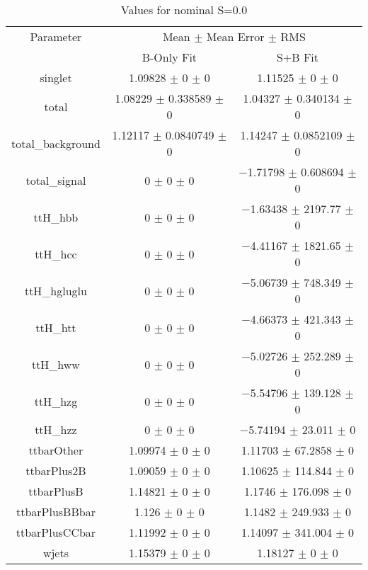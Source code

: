 \begin{table}
\centering
\caption{Values for nominal S=0.0}
\begin{tabular}{ccc}
\toprule
Parameter & \multicolumn{2}{c}{Mean $\pm$ Mean Error $\pm$ RMS}\\
 & B-Only Fit & S+B Fit\\
\midrule
singlet & \num{1.09828} $\pm$ \num{0} $\pm$ \num{0} & \num{1.11525} $\pm$ \num{0} $\pm$ \num{0}\\
total & \num{1.08229} $\pm$ \num{0.338589} $\pm$ \num{0} & \num{1.04327} $\pm$ \num{0.340134} $\pm$ \num{0}\\
total\_background & \num{1.12117} $\pm$ \num{0.0840749} $\pm$ \num{0} & \num{1.14247} $\pm$ \num{0.0852109} $\pm$ \num{0}\\
total\_signal & \num{0} $\pm$ \num{0} $\pm$ \num{0} & \num{-1.71798} $\pm$ \num{0.608694} $\pm$ \num{0}\\
ttH\_hbb & \num{0} $\pm$ \num{0} $\pm$ \num{0} & \num{-1.63438} $\pm$ \num{2197.77} $\pm$ \num{0}\\
ttH\_hcc & \num{0} $\pm$ \num{0} $\pm$ \num{0} & \num{-4.41167} $\pm$ \num{1821.65} $\pm$ \num{0}\\
ttH\_hgluglu & \num{0} $\pm$ \num{0} $\pm$ \num{0} & \num{-5.06739} $\pm$ \num{748.349} $\pm$ \num{0}\\
ttH\_htt & \num{0} $\pm$ \num{0} $\pm$ \num{0} & \num{-4.66373} $\pm$ \num{421.343} $\pm$ \num{0}\\
ttH\_hww & \num{0} $\pm$ \num{0} $\pm$ \num{0} & \num{-5.02726} $\pm$ \num{252.289} $\pm$ \num{0}\\
ttH\_hzg & \num{0} $\pm$ \num{0} $\pm$ \num{0} & \num{-5.54796} $\pm$ \num{139.128} $\pm$ \num{0}\\
ttH\_hzz & \num{0} $\pm$ \num{0} $\pm$ \num{0} & \num{-5.74194} $\pm$ \num{23.011} $\pm$ \num{0}\\
ttbarOther & \num{1.09974} $\pm$ \num{0} $\pm$ \num{0} & \num{1.11703} $\pm$ \num{67.2858} $\pm$ \num{0}\\
ttbarPlus2B & \num{1.09059} $\pm$ \num{0} $\pm$ \num{0} & \num{1.10625} $\pm$ \num{114.844} $\pm$ \num{0}\\
ttbarPlusB & \num{1.14821} $\pm$ \num{0} $\pm$ \num{0} & \num{1.1746} $\pm$ \num{176.098} $\pm$ \num{0}\\
ttbarPlusBBbar & \num{1.126} $\pm$ \num{0} $\pm$ \num{0} & \num{1.1482} $\pm$ \num{249.933} $\pm$ \num{0}\\
ttbarPlusCCbar & \num{1.11992} $\pm$ \num{0} $\pm$ \num{0} & \num{1.14097} $\pm$ \num{341.004} $\pm$ \num{0}\\
wjets & \num{1.15379} $\pm$ \num{0} $\pm$ \num{0} & \num{1.18127} $\pm$ \num{0} $\pm$ \num{0}\\
\bottomrule
\end{tabular}
\end{table}